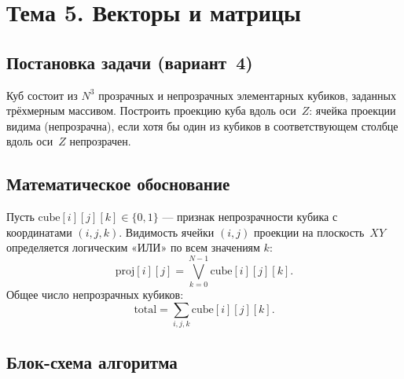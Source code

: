 \section{Тема 5. Векторы и матрицы}

\subsection{Постановка задачи (вариант~4)}

Куб состоит из $N^3$ прозрачных и непрозрачных элементарных
кубиков, заданных трёхмерным массивом. Построить проекцию куба
вдоль оси~$Z$: ячейка проекции видима (непрозрачна), если хотя бы
один из кубиков в соответствующем столбце вдоль оси~$Z$
непрозрачен.

\subsection{Математическое обоснование}

Пусть $\text{cube}[i][j][k] \in \{0,1\}$ --- признак непрозрачности
кубика с координатами $(i,j,k)$. Видимость ячейки $(i,j)$ проекции
на плоскость~$XY$ определяется логическим «ИЛИ» по всем значениям
$k$:
\[
  \text{proj}[i][j] = \bigvee_{k=0}^{N-1} \text{cube}[i][j][k].
\]
Общее число непрозрачных кубиков:
\[
  \text{total} = \sum_{i,j,k} \text{cube}[i][j][k].
\]

\subsection{Блок-схема алгоритма}

